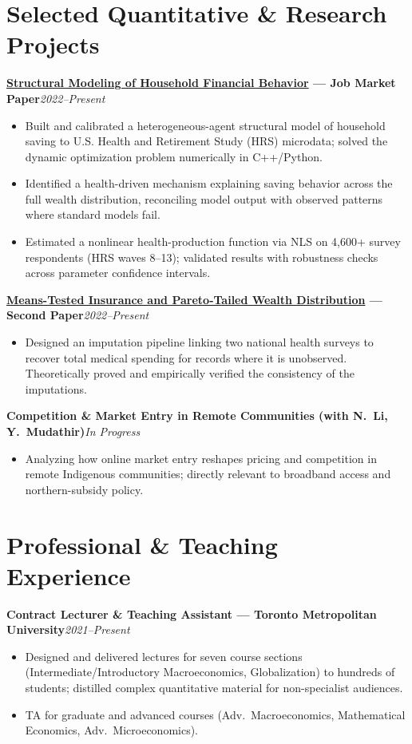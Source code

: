 \documentclass[10pt]{article}
\newcommand{\entry}[2]{%
  \noindent\textbf{#1}\hfill{\small\itshape #2}\par\vspace{1pt}}
\begin{document}
\section{Selected Quantitative \& Research Projects}
\entry{\href{https://aminshz.github.io/my-website/paper1.pdf}{Structural Modeling of Household Financial Behavior} — Job Market Paper}{2022--Present}
\begin{itemize}
\item Built and calibrated a heterogeneous-agent structural model of household saving to U.S. Health and Retirement Study (HRS) microdata; solved the dynamic optimization problem numerically in C++/Python.
\item Identified a health-driven mechanism explaining saving behavior across the full wealth distribution, reconciling model output with observed patterns where standard models fail.
\item Estimated a nonlinear health-production function via NLS on 4{,}600+ survey respondents (HRS waves 8--13); validated results with robustness checks across parameter confidence intervals.
\end{itemize}

\entry{\href{https://aminshz.github.io/my-website/paper2.pdf}{Means-Tested Insurance and Pareto-Tailed Wealth Distribution} — Second Paper}{2022--Present}
\begin{itemize}
\item Designed an imputation pipeline linking two national health surveys to recover total medical spending for records where it is unobserved. Theoretically proved and empirically verified the consistency of the imputations.
\end{itemize}

\entry{Competition \& Market Entry in Remote Communities (with N.\ Li, Y.\ Mudathir)}{In Progress}
\begin{itemize}
\item Analyzing how online market entry reshapes pricing and competition in remote Indigenous communities; directly relevant to broadband access and northern-subsidy policy.
\end{itemize}

\section{Professional \& Teaching Experience}
\entry{Contract Lecturer \& Teaching Assistant — Toronto Metropolitan University}{2021--Present}
\begin{itemize}
\item Designed and delivered lectures for seven course sections (Intermediate/Introductory Macroeconomics, Globalization) to hundreds of students; distilled complex quantitative material for non-specialist audiences.
\item TA for graduate and advanced courses (Adv.\ Macroeconomics, Mathematical Economics, Adv.\ Microeconomics).
\end{itemize}
\end{document}
